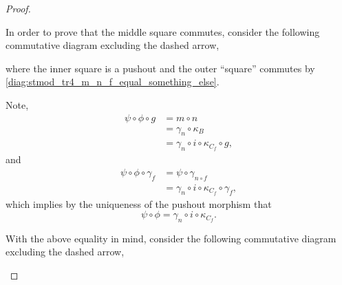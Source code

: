 \begin{proof}
\begin{enumerate}[label={(\bfseries TR\arabic*)}]
{            In order to prove that the middle square commutes, consider the following commutative diagram excluding the dashed arrow,
            \begin{center}
            \end{center}
            where the inner square is a pushout and the outer ``square'' commutes by \eqref{diag:stmod_tr4_m_n_f_equal_something_else}.

            Note,
            \begin{align*}
                \psi \circ \phi \circ g &= m \circ n \\
                &= \gamma_n \circ \kappa_B \\
                &= \gamma_n \circ i \circ \kappa_{C_f} \circ g,
            \end{align*}
            and
            \begin{align*}
                \psi \circ \phi \circ \gamma_f &= \psi \circ \gamma_{n \circ f} \\
                &= \gamma_n \circ i \circ \kappa_{C_f} \circ \gamma_f,
            \end{align*}
            which implies by the uniqueness of the pushout morphism that
            \[
                \psi \circ \phi = \gamma_n \circ i \circ \kappa_{C_f}.
            \]

            With the above equality in mind, consider the following commutative diagram excluding the dashed arrow,
            \begin{center}
\end{center}}
\end{enumerate}
\end{proof}
